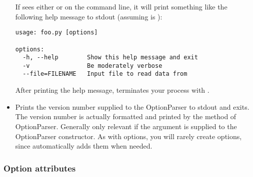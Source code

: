 \begin{itemize}
If  sees either  or  on the command line, it
will print something like the following help message to stdout
(assuming  is ):
\begin{verbatim}
usage: foo.py [options]

options:
  -h, --help        Show this help message and exit
  -v                Be moderately verbose
  --file=FILENAME   Input file to read data from
\end{verbatim}

After printing the help message,  terminates your process
with .

\item {} 

Prints the version number supplied to the OptionParser to stdout and
exits.  The version number is actually formatted and printed by the
 method of OptionParser.  Generally only relevant
if the  argument is supplied to the OptionParser
constructor.  As with  options, you will rarely create
 options, since  automatically adds them when needed.

\end{itemize}


\subsubsection{Option attributes\label{optparse-option-attributes}}

